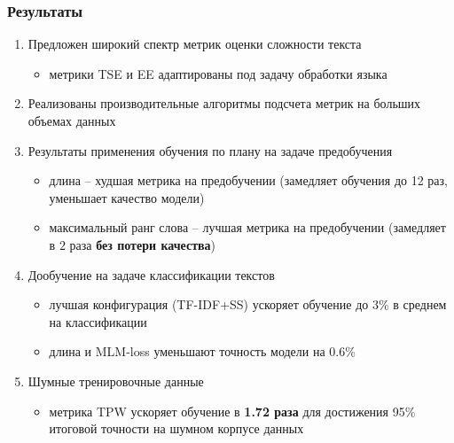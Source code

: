 \documentclass{beamer}
\begin{document}
\begin{frame}
	\frametitle{Результаты}
	\begin{enumerate}
		\item Предложен широкий спектр метрик оценки сложности текста
		\begin{itemize}
			\item метрики TSE и EE адаптированы под задачу обработки языка
		\end{itemize}
		\item Реализованы производительные алгоритмы подсчета метрик на больших объемах данных
		\item Результаты применения обучения по плану на задаче предобучения
			\begin{itemize}
				\item длина -- худшая метрика на предобучении (замедляет обучения до 12 раз, уменьшает качество модели)
				\item максимальный ранг слова -- лучшая метрика на предобучении (замедляет в $2$ раза {\bf без потери качества})
			\end{itemize}
		\item Дообучение на задаче классификации текстов
			\begin{itemize}
				\item лучшая конфигурация (TF-IDF+SS) ускоряет обучение до 3\% в среднем на классификации
				\item длина и MLM-loss уменьшают точность модели на 0.6\%
			\end{itemize}
		\item Шумные тренировочные данные
			\begin{itemize}
				\item 
				метрика TPW ускоряет обучение в {\bf 1.72 раза} для достижения 95\% итоговой точности на шумном корпусе данных
			\end{itemize}
	\end{enumerate}
\end{frame}

\appendix
\end{document}
